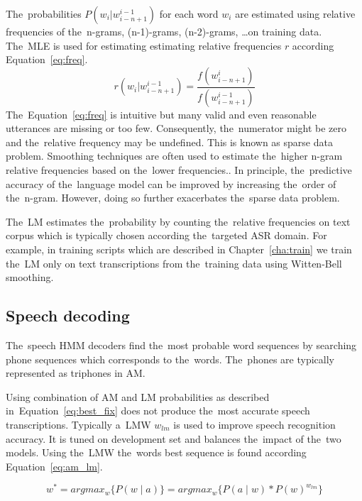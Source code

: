 The~probabilities $P(w_i|w^{i-1}_{i-n+1})$ for each word $w_i$ are estimated using relative frequencies of the~n-grams, (n-1)-grams, (n-2)-grams, \ldots on training data.
The~\ac{MLE} is used for estimating estimating relative frequencies $r$ according Equation~\ref{eq:freq}.
\begin{equation} \label{eq:freq}
    r(w_i|w^{i-1}_{i-n+1}) = \frac{f(w^i_{i-n+1})} {f(w^{i-1}_{i-n+1})}
\end{equation}
The~Equation~\ref{eq:freq} is intuitive but many valid and even reasonable utterances are missing or too few.
Consequently, the~numerator might be zero and the~relative frequency may be undefined.
This is known as sparse data problem.
Smoothing techniques are often used to estimate the~higher n-gram relative frequencies based on the~lower frequencies.\cite{goodman2001bit}.
In principle, the~predictive accuracy of the~language model can be improved by increasing the~order of the~n-gram.
However, doing so further exacerbates the~sparse data problem.\cite{brants2007large}

The~\ac{LM} estimates the~probability by counting the~relative frequencies on text corpus which is typically chosen according the~targeted \ac{ASR} domain.
For example, in training scripts which are described in Chapter~\ref{cha:train} we train the~\ac{LM} only on text transcriptions from the~training data using Witten-Bell smoothing.\cite{witten1991zero}


\subsection{Speech decoding}
\label{sub:decode}
The~speech \ac{HMM} decoders find the~most probable word sequences by searching phone sequences which corresponds to the~words.
The~phones are typically represented as triphones in \ac{AM}.

Using combination of \ac{AM} and \ac{LM} probabilities as described in~Equation~\ref{eq:best_fix} does not produce the~most accurate speech transcriptions. 
Typically a~\ac{LMW} $w_{lm}$ is used to improve speech recognition accuracy.
It is tuned on development set and balances the~impact of the~two models.
Using the~\ac{LMW} the~words best sequence is found according Equation~\ref{eq:am_lm}.

\begin{equation}\label{eq:am_lm}
    w^* = argmax_{w}\{P(w \mid a)\} = argmax_{w}\{P(a \mid w) * P(w)^{w_{lm}}\}
\end{equation}

